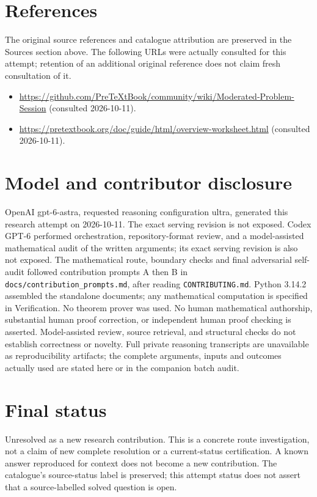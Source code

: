\documentclass[11pt]{article}
\begin{document}
\section{References}
The original source references and catalogue attribution are preserved in the
Sources section above. The following URLs were actually consulted for this attempt;
retention of an additional original reference does not claim fresh consultation of it.
\begin{itemize}
\item \url{https://github.com/PreTeXtBook/community/wiki/Moderated-Problem-Session} (consulted 2026-10-11). 
\item \url{https://pretextbook.org/doc/guide/html/overview-worksheet.html} (consulted 2026-10-11). 
\end{itemize}
\section{Model and contributor disclosure}
OpenAI gpt-6-astra, requested reasoning configuration ultra, generated this research
attempt on 2026-10-11. The exact serving revision is not exposed. Codex GPT-6
performed orchestration, repository-format review, and a model-assisted mathematical
audit of the written arguments; its exact serving revision
is also not exposed. The mathematical route, boundary checks and final adversarial
self-audit followed contribution prompts A then B in
\texttt{docs/contribution\_prompts.md}, after reading \texttt{CONTRIBUTING.md}.
Python 3.14.2 assembled the standalone documents; any mathematical computation is
specified in Verification. No theorem prover was used. No human mathematical
authorship, substantial human proof correction, or independent human proof checking
is asserted. Model-assisted review, source retrieval, and structural checks do not
establish correctness or novelty. Full private reasoning transcripts are unavailable
as reproducibility artifacts; the complete arguments, inputs and outcomes actually
used are stated here or in the companion batch audit.
\section{Final status}
Unresolved as a new research contribution. This is a concrete route investigation,
not a claim of new complete resolution or a current-status certification. A known
answer reproduced for context does not become a new contribution. The catalogue's
source-status label is preserved; this attempt status does not assert that a
source-labelled solved question is open.
\end{document}
